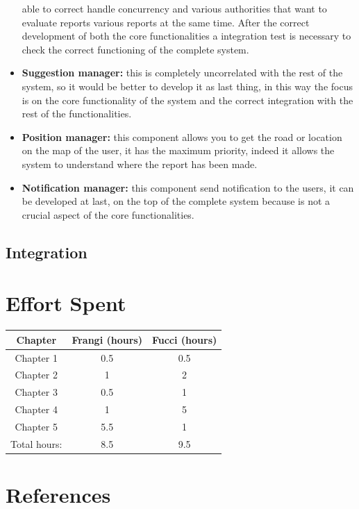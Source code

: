 \documentclass[12pt,a4paper]{report}
\begin{document}
\begin{itemize}
					able to correct handle concurrency and various authorities that want to evaluate reports various
					reports at the same time. After the correct development of both the core functionalities a integration
					test is necessary to check the correct functioning of the complete system.  
				\item \textbf{Suggestion manager:} this is completely uncorrelated with the rest of the system, so it would be
					better to develop it as last thing, in this way the focus is on the core functionality of the system and
					the correct integration with the rest of the functionalities.
				\item \textbf{Position manager:} this component allows you to get the road or location on the map of the
					user, it has the maximum priority, indeed it allows the system to understand where the report has been
					made.
				\item \textbf{Notification manager:} this component send notification to the users, it can be developed at
					last, on the top of the complete system because is not a crucial aspect of the core functionalities.
			\end{itemize}
		\section{Integration}
			
			


	\chapter{Effort Spent}
		\begin{table}[H]
			\centering
			\begin{tabular}{|c|c|c|}
				\hline
				Chapter & Frangi (hours) & Fucci (hours)\\
				\hline
				\hline
				Chapter 1 & 0.5 & 0.5\\
				
				Chapter 2 & 1 & 2\\
				
				Chapter 3 & 0.5 & 1\\
				
				Chapter 4 & 1 & 5\\
				
				Chapter 5 & 5.5 & 1\\
				
				Total hours: & 8.5 & 9.5\\
				\hline
			\end{tabular}
			\label{tab: }
		\end{table}
	\chapter{References}
\end{document}
